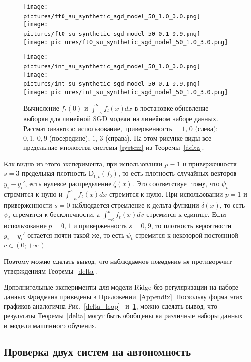    \begin{figure}[h!]
        \centering
        \texttt{[image: pictures/ft0\_su\_synthetic\_sgd\_model\_50\_1.0\_0.0.png]}~
        \texttt{[image: pictures/ft0\_su\_synthetic\_sgd\_model\_50\_0.1\_0.9.png]}~
        \texttt{[image: pictures/ft0\_su\_synthetic\_sgd\_model\_50\_1.0\_3.0.png]}

        \texttt{[image: pictures/int\_su\_synthetic\_sgd\_model\_50\_1.0\_0.0.png]}~
        \texttt{[image: pictures/int\_su\_synthetic\_sgd\_model\_50\_0.1\_0.9.png]}~
        \texttt{[image: pictures/int\_su\_synthetic\_sgd\_model\_50\_1.0\_3.0.png]}
        
        \caption{Вычисление $f_t(0)$ и $\int_{-\kappa}^{\kappa}f_t(x)dx$ в постановке обновление выборки для линейной SGD модели на линейном наборе данных. Рассматриваются: использование, приверженность = $1$, $0$ (слева); $0,1$, $0,9$ (посередине); $1$, $3$ (справа). На этом рисунке виды все предельные множества системы \eqref{system} из Теоремы~\ref{delta}.}
        \label{delta_sample}
    \end{figure}

    Как видно из этого эксперимента, при использовании $p = 1$ и приверженности $s = 3$ предельная плотность $\text{D}_{\overline{1, t}}(f_0)$, то есть плотность случайных векторов $y_i - y_i'$, есть нулевое распределение $\zeta(x)$. Это соответствует тому, что $\psi_t$ стремится к нулю и $\int_{-\kappa}^{\kappa}f_t(x)dx$ стремится к нулю.
    При использовании $p = 1$ и приверженности $s = 0$ наблюдается стремление к дельта-функции $\delta(x)$, то есть $\psi_t$ стремится к бесконечности, а $\int_{-\kappa}^{\kappa}f_t(x)dx$ стремится к единице. 
    Если использование $p = 0,1$ и приверженность $s = 0,9$, то плотность вероятности $y_i - y_i'$ остается почти такой же, то есть $\psi_t$ стремится к некоторой постоянной $c \in (0; +\infty)$. 

    Поэтому можно сделать вывод, что наблюдаемое поведение не противоречит утверждениям Теоремы~\ref{delta}.

    Дополнительные эксперименты для модели Ridge без регуляризации на наборе данных Фридмана приведены в Приложении~\ref{Appendix}. Поскольку форма этих графиков аналогична Рис.~\ref{delta_loop}~ и~\ref{delta_sample}, можно сделать вывод, что результаты Теоремы~\ref{delta} могут быть обобщены на различные наборы данных и модели машинного обучения.

\subsection{Проверка двух систем на автономность} \label{exp_4}

